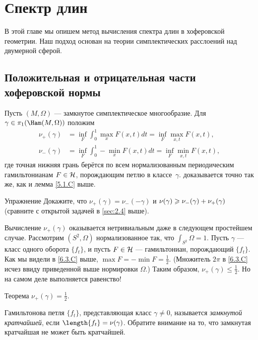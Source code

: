 \chapter{Спектр длин}\label{chap:9}

В этой главе мы опишем метод вычисления спектра длин в хоферовской геометрии.
Наш подход основан на теории симплектических расслоений над двумерной сферой.

\section{Положительная и отрицательная части хоферовской нормы}

Пусть $(M, \Omega)$ --- замкнутое симплектическое многообразие.
Для $\gamma \in \pi_1 (\Ham(M, \Omega))$ положим 
\begin{align*}
\nu_+ (\gamma) &= \inf_F \int_0^1 \max_x F (x, t)dt = \inf_F \max_{x,t}F (x, t),
\\ 
\nu_- (\gamma) &= \inf_F \int_0^1 -\min_x F (x, t)dt = \inf_F \min_{x,t}F (x, t),
\end{align*}
где точная нижняя грань берётся по всем нормализованным периодическим
гамильтонианам $F \in \mathcal{H}$, порождающим петлю в классе~$\gamma$. 
доказывается точно так же, как и лемма \ref{5.1.C} выше.

\begin{ex*}{Упражнение}
Докажите, что $\nu_+ (\gamma) = \nu_- (-\gamma)$ и $\nu(\gamma) \z\ge
\nu_- (\gamma) + \nu_+ (\gamma)$ 
(сравните с открытой задачей в \ref{sec:2.4} выше).
\end{ex*}

Вычисление $\nu_+ (\gamma)$ оказывается нетривиальным даже в следующем
простейшем случае. 
Рассмотрим $(S^2, \Omega)$ нормализованное так, что $\int_{S^2} \Omega = 1$.
Пусть $\gamma$ --- класс одного оборота $\{f_t\}$, и пусть $F \in \mathcal{H}$
--- гамильтониан, порождающий $\{f_t\}$. 
Как мы видели в \ref{6.3.C} выше,  $\max F = - \min F = \frac12$.
(Множитель $2\pi$ в \ref{6.3.C} исчез ввиду приведенной выше
нормировки $\Omega$.) 
Таким образом, $\nu_+ (\gamma) \le \frac12$.
Но на самом деле выполняется равенство!

\begin{thm}{Теорема}\label{9.1.A}
$\nu_+ (\gamma) = \frac12$.
\end{thm}

Гамильтонова петля $\{f_t \}$, представляющая класс $\gamma \ne 0$,
называется \emph{замкнутой кратчайшей}, если $\length\{f_t \} =
\nu(\gamma)$.
Обратите внимание на то, что замкнутая кратчайшая не может быть
кратчайшей.

